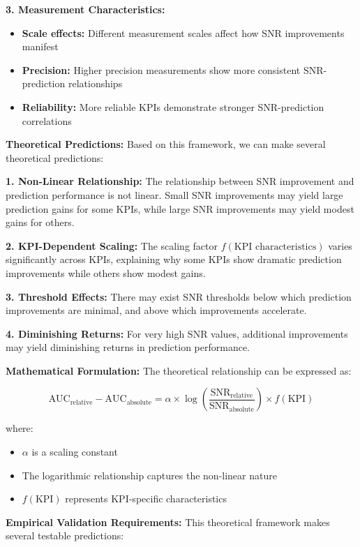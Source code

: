 \textbf{3. Measurement Characteristics:}
\begin{itemize}
    \item \textbf{Scale effects:} Different measurement scales affect how SNR improvements manifest
    \item \textbf{Precision:} Higher precision measurements show more consistent SNR-prediction relationships
    \item \textbf{Reliability:} More reliable KPIs demonstrate stronger SNR-prediction correlations
\end{itemize}

\textbf{Theoretical Predictions:}
Based on this framework, we can make several theoretical predictions:

\textbf{1. Non-Linear Relationship:}
The relationship between SNR improvement and prediction performance is not linear. Small SNR improvements may yield large prediction gains for some KPIs, while large SNR improvements may yield modest gains for others.

\textbf{2. KPI-Dependent Scaling:}
The scaling factor $f(\text{KPI characteristics})$ varies significantly across KPIs, explaining why some KPIs show dramatic prediction improvements while others show modest gains.

\textbf{3. Threshold Effects:}
There may exist SNR thresholds below which prediction improvements are minimal, and above which improvements accelerate.

\textbf{4. Diminishing Returns:}
For very high SNR values, additional improvements may yield diminishing returns in prediction performance.

\textbf{Mathematical Formulation:}
The theoretical relationship can be expressed as:

$$\text{AUC}_{\text{relative}} - \text{AUC}_{\text{absolute}} = \alpha \times \log\left(\frac{\text{SNR}_{\text{relative}}}{\text{SNR}_{\text{absolute}}}\right) \times f(\text{KPI})$$

where:
\begin{itemize}
    \item $\alpha$ is a scaling constant
    \item The logarithmic relationship captures the non-linear nature
    \item $f(\text{KPI})$ represents KPI-specific characteristics
\end{itemize}

\textbf{Empirical Validation Requirements:}
This theoretical framework makes several testable predictions:

